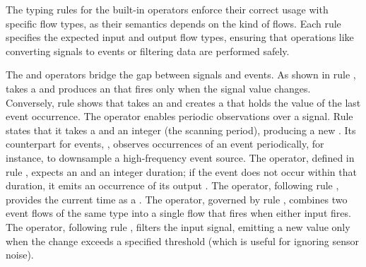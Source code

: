 The typing rules for the built-in \GReact operators enforce their correct usage with specific flow
types, as their semantics depends on the kind of flows. Each rule specifies the expected input and
output flow types, ensuring that operations like converting signals to events or
filtering data are performed safely.

The  and  operators bridge the gap
between signals and events. As shown in rule ,
 takes a \signal{\TY} and produces an \event{\TY} that fires only when the signal
value changes. Conversely, rule  shows that
 takes an \event{\TY} and creates a \signal{\TY} that holds the value of the last event
occurrence.
%
The  operator enables periodic observations over a signal.
Rule  states that it takes a \signal{\TY} and an
integer (the scanning period), producing a new \signal{\TY}. Its counterpart for events,
, observes occurrences of an event periodically, for instance, to downsample a
high-frequency event source.
%
The  operator, defined in rule
, expects an \event{\TY} and an integer duration;
if the event does not occur within that duration, it emits an occurrence of its output
\event{\unitTY}. The  operator, following rule
, provides the current time as a \signal{\floatTY}.
%
The  operator, governed by rule
, combines two event flows of the same type into a
single flow that fires when either input fires. The  operator, following rule
, filters the input signal, emitting a new value
only when the change exceeds a specified threshold \DELTA (which is useful for ignoring sensor
noise).

